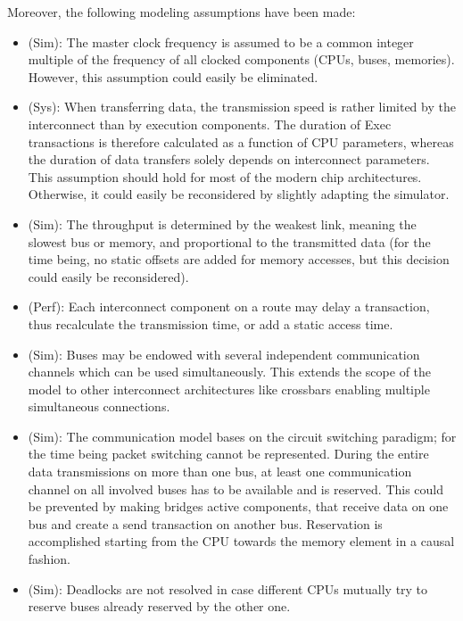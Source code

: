 \documentclass{llncs}
\begin{document}
\begin{subappendices}
%
Moreover, the following modeling assumptions have been made:
%
\begin{itemize}
	\item (Sim): The master clock frequency is assumed to be a common integer multiple of the frequency of all
	clocked components (CPUs, buses, memories). However, this assumption could easily be eliminated.
	\item (Sys): When transferring data, the transmission speed is rather limited by the interconnect than by
	execution components. The duration of Exec transactions is therefore calculated as a function of CPU parameters,
	whereas the duration of data transfers solely depends on interconnect parameters. This assumption should hold
	for most of the modern chip architectures. Otherwise, it could easily be reconsidered by slightly adapting the
	simulator.
	\item (Sim): The throughput is determined by the weakest link, meaning the slowest bus or memory, and
	proportional to the transmitted data (for the time being, no static offsets are added for memory accesses, but
	this decision could easily be reconsidered).
	\item (Perf): Each interconnect component on a route may delay a transaction, thus recalculate the transmission
	time, or add a static access time.
	\item (Sim): Buses may be endowed with several independent communication channels which can be used
	simultaneously. This extends the scope of the model to other interconnect architectures like crossbars enabling
	multiple simultaneous connections.
	\item (Sim): The communication model bases on the circuit switching paradigm; for the time being packet
	switching cannot be represented. During the entire data transmissions on more than one bus, at least one
	communication channel on all involved buses has to be available and is reserved. This could be prevented by
	making bridges active components, that receive data on one bus and create a send transaction on another bus.
	Reservation is accomplished starting from the CPU towards the memory element in a causal fashion.
	\item (Sim): Deadlocks are not resolved in case different CPUs mutually try to reserve buses already reserved by
	the other one. 

\end{itemize}
\end{subappendices}
\end{document}

